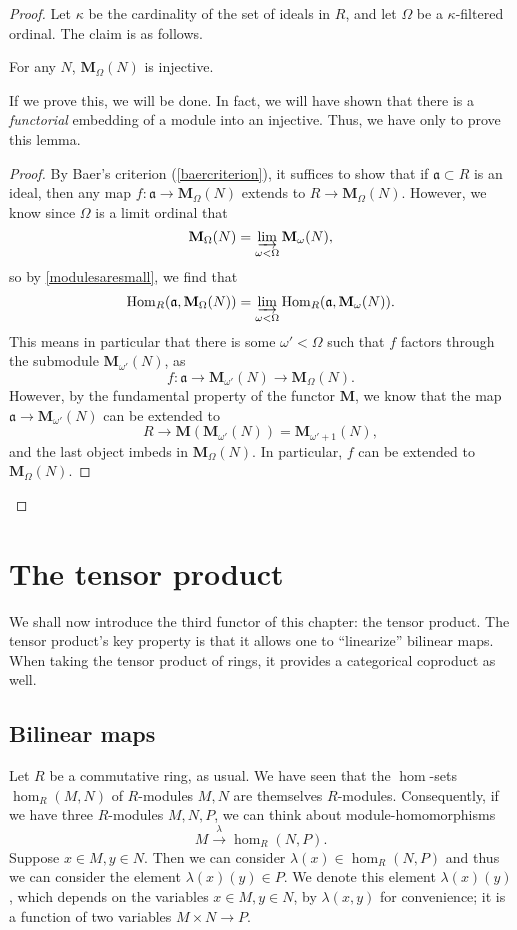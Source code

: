 \begin{proof}
Let $\kappa$ be the cardinality of the set of ideals in $R$, and let $\Omega$
be a $\kappa$-filtered ordinal.
The claim is as follows.

\begin{lemma} 
For any $N$, $\mathbf{M}_{\Omega}(N)$ is injective.
\end{lemma} 

If we prove this, we will be done. In fact, we will have shown that there is a
\emph{functorial} embedding of a module into an injective.
Thus, we have only to prove this lemma.

\begin{proof} 
By Baer's criterion (\cref{baercriterion}), it suffices to show that if
$\mathfrak{a} \subset R$ is an ideal, then any map $f: \mathfrak{a} \to
\mathbf{M}_{\Omega}(N)$ extends to $R \to \mathbf{M}_{\Omega}(N)$. However, we
know since $\Omega$ is a limit ordinal that 
\[ \mathbf{M}_{\Omega}(N) = \varinjlim_{\omega < \Omega}
\mathbf{M}_{\omega}(N),  \]
so by \cref{modulesaresmall}, we find that 
\[ \hom_R(\mathfrak{a}, \mathbf{M}_{\Omega}(N)) = \varinjlim_{\omega < \Omega}
\hom_R(\mathfrak{a}, \mathbf{M}_{\omega}(N)).   \]
This means in particular that there is some $\omega' < \Omega$ such that $f$
factors through the submodule $\mathbf{M}_{\omega'}(N)$, as
\[ f: \mathfrak{a} \to \mathbf{M}_{\omega'}(N) \to \mathbf{M}_{\Omega}(N).  \]
However, by the fundamental property of the functor $\mathbf{M}$, we know that
the map $\mathfrak{a} \to \mathbf{M}_{\omega'}(N)$ can be extended to 
\[ R \to \mathbf{M}( \mathbf{M}_{\omega'}(N)) = \mathbf{M}_{\omega' + 1}(N),  \]
and the last object imbeds in $\mathbf{M}_{\Omega}(N)$.
In particular, $f$ can be extended to $\mathbf{M}_{\Omega}(N)$.
\end{proof} 


\end{proof} 

\section{The tensor product}

We shall now introduce the third functor of this chapter: the tensor product.
The tensor product's key property is that it allows one to ``linearize''
bilinear maps. When taking the tensor product of rings, it provides a
categorical coproduct as well.

\subsection{Bilinear maps}
Let $R$ be a commutative ring, as usual.
We have seen that the $\hom$-sets $\hom_R(M,N)$ of $R$-modules $M,N$ are themselves
$R$-modules.
Consequently, if we have three $R$-modules $M,N,P$, we can think about
module-homomorphisms
\[ M \stackrel{\lambda}{\to}\hom_R(N,P).  \]
Suppose $x \in M, y \in N$.  Then we can consider
\( \lambda(x) \in \hom_R(N,P)  \)
and thus we can consider the element
\( \lambda(x)(y) \in P.  \)
We denote this element $\lambda(x)(y)$, which depends on the variables $x \in
M, y \in N$, by $\lambda(x,y)$ for convenience; it
is a function of two variables $M \times N \to P$.

